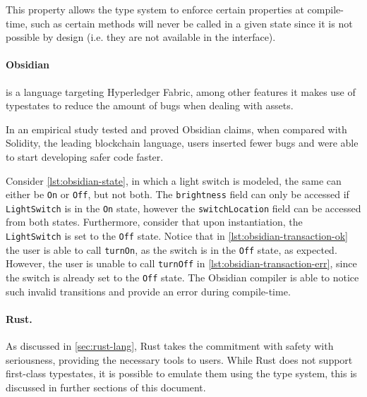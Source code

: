 This property allows the type system to enforce certain properties at compile-time,
such as certain methods will never be called in a given state since it is not possible by design
(i.e. they are not available in the interface).



\paragraph{Obsidian} is a language targeting Hyperledger Fabric,
among other features it makes use of typestates to reduce the amount of bugs when dealing with assets.

In \autocite{Coblenz2020} an empirical study tested and proved Obsidian claims,
when compared with Solidity, the leading blockchain language,
users inserted fewer bugs and were able to start developing safer code faster.

Consider \autoref{lst:obsidian-state}, in which a light switch is modeled,
the same can either be \texttt{On} or \texttt{Off}, but not both.
The \texttt{brightness} field can only be accessed if \texttt{LightSwitch} is in the \texttt{On} state,
however the \texttt{switchLocation} field can be accessed from both states.
Furthermore, consider that upon instantiation, the \texttt{LightSwitch} is set to the \texttt{Off} state.
Notice that in \autoref{lst:obsidian-transaction-ok} the user is able to call \texttt{turnOn},
as the switch is in the \texttt{Off} state, as expected.
However, the user is unable to call \texttt{turnOff} in \autoref{lst:obsidian-transaction-err},
since the switch is already set to the \texttt{Off} state.
The Obsidian compiler is able to notice such invalid transitions and provide an error during compile-time.








\paragraph{Rust.}
As discussed in \autoref{sec:rust-lang}, Rust takes the commitment with safety with seriousness,
providing the necessary tools to users. While Rust does not support first-class typestates,
it is possible to emulate them using the type system, this is discussed in further sections of this document.

